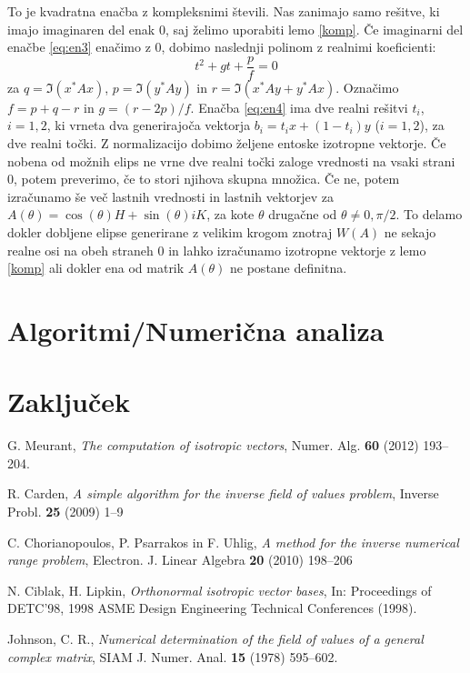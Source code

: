 \documentclass[12pt,a4paper]{amsart}
\theoremstyle{definition}
\theoremstyle{plain}
\begin{document}
To je kvadratna enačba z kompleksnimi števili. Nas zanimajo samo rešitve, ki imajo imaginaren del enak 0, saj želimo uporabiti lemo \ref{komp}.
Če imaginarni del enačbe \eqref{eq:en3} enačimo z 0, dobimo naslednji polinom z realnimi koeficienti:
\begin{equation}
t^2+gt+\frac{p}{f}=0 \label{eq:en4}
\end{equation}
za $q=\Im(x^\ast Ax)$, $p=\Im(y^\ast Ay)$ in $r=\Im(x^\ast  Ay + y^\ast Ax)$. Označimo $f=p+q-r$ in $g=(r-2p)/f$. Enačba \eqref{eq:en4} ima dve realni rešitvi $t_i$, $i=1,2$, ki vrneta dva generirajoča vektorja $b_i=t_ix+(1-t_i)y$ ($i=1,2$), za dve realni točki. Z normalizacijo dobimo željene entoske izotropne vektorje. Če nobena od možnih elips ne vrne dve realni točki zaloge vrednosti na vsaki strani 0, potem preverimo, če to stori njihova skupna množica. Če ne, potem izračunamo še več lastnih vrednosti in lastnih vektorjev za $A(\theta)=\cos(\theta)H+\sin(\theta)iK$, za kote $\theta$ drugačne od $\theta \not =0,\pi/2$. To delamo dokler dobljene elipse generirane z velikim krogom znotraj $W(A)$ ne sekajo realne osi na obeh straneh 0 in lahko izračunamo izotropne vektorje z lemo \ref{komp} ali dokler ena od matrik $A(\theta)$ ne postane definitna.
\section{Algoritmi/Numerična analiza}
\section{Zaključek}



\vfill

\begin{thebibliography}{99}

G. Meurant, \emph{The computation of isotropic vectors}, Numer. Alg. {\bf 60} (2012) 193--204.

R. Carden, \emph{A simple algorithm for the inverse field of values problem}, Inverse Probl. {\bf 25} (2009) 1--9

C. Chorianopoulos, P. Psarrakos in F. Uhlig, \emph{A method for the inverse numerical range problem}, Electron. J. Linear Algebra {\bf 20} (2010) 198--206

N. Ciblak, H. Lipkin, \emph{Orthonormal isotropic vector bases}, In: Proceedings of DETC'98, 1998 ASME Design Engineering Technical Conferences (1998).

Johnson, C. R., \emph{Numerical determination of the field of values of a general complex matrix}, SIAM J. Numer. Anal. {\bf15} (1978) 595--602.


\end{thebibliography}
\end{document}
